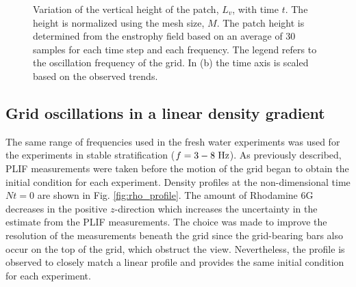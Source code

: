 \documentclass{piv13-abstract}
\newcommand{\unit}[1]{\ensuremath{\, \mathrm{\hspace{0.5mm}#1}}}
\newcommand{\figLabel}{Fig. }
\begin{document}
\begin{figure}[ht]
\centering
{}
\caption{Variation of the vertical height of the patch, $L_v$, with time $t$. The height is normalized using the mesh size, $M$. The patch height is determined from the enstrophy field based on an average of 30 samples for each time step and each frequency. The legend refers to the oscillation frequency of the grid.  In (b) the time axis is scaled based on the observed trends. \label{fig:freshBoundaries}}
\end{figure}

\subsection{Grid oscillations in a linear density gradient}
\label{sec:stratified_results}

The same range of frequencies used in the fresh water experiments was used for the experiments in stable stratification ($f=3-8\unit{Hz}$). As previously described, PLIF measurements were taken before the motion of the grid began to obtain the initial condition for each experiment. Density profiles at the non-dimensional time $Nt = 0$ are shown in \figLabel\ref{fig:rho_profile}. The amount of Rhodamine 6G decreases in the positive $z$-direction which increases the uncertainty in the estimate from the PLIF measurements. The choice was made to improve the resolution of the measurements beneath the grid since the grid-bearing bars also occur on the top of the grid, which obstruct the view. Nevertheless, the profile is observed to closely match a linear profile and provides the same initial condition for each experiment.
\end{document}
